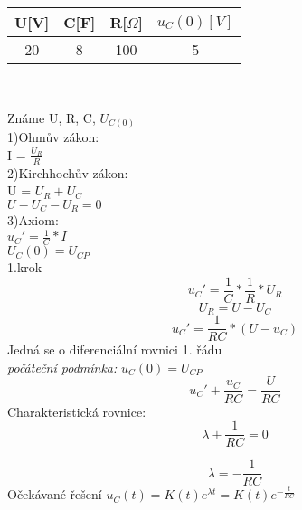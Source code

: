 \documentclass[12pt]{article}
\begin{document}
\begin{center}
\begin{tabular}{| c | c | c | c |}
\hline
U[V] & C[F] & R[$\Omega$] & $u_{C}(0)[V]$ \\
\hline
20 & 8 & 100 & 5\\
\hline
\end{tabular}\\
\end{center}
Známe U, R, C, $U_{C(0)}$\\
1)Ohmův zákon:\\ I = $\frac{U_{R}}{R}$\\
2)Kirchhochův zákon:\\ U = $U_{R}+U_{C}$\\ $U-U_{C}-U_{R}=0$\\
3)Axiom:\\$u_{C}'=\frac{1}{C}*I$\\ $U_{C}(0)=U_{CP}$\\
1.krok\\
\[
  u_{C}'=\displaystyle\frac{1}{C}*\displaystyle\frac{1}{R}*U_{R}
\]
\[
  U_{R} = U-U_{C}
\]
\[
  u_{C}'=\displaystyle\frac{1}{RC}*(U-u_{C})
\]
Jedná se o diferenciální rovnici 1. řádu\\
\textit{počáteční podmínka:} $u_{C}(0)=U_{CP}$\\
\[
  u_{C}'+\displaystyle\frac{u_{C}}{RC}= \displaystyle\frac{U}{RC}
\]
Charakteristická rovnice:
\[
  \lambda + \displaystyle\frac{1}{RC}=0
\]

\[
  \lambda =-\displaystyle\frac{1}{RC}
\]
Očekávané řešení $u_{C}(t)=K(t)e^{\lambda t} = K(t)e^{-\frac{t}{RC}}$\\
\end{document}
